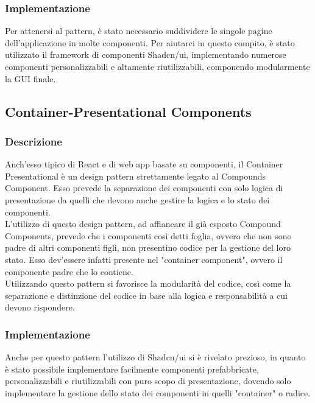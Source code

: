 \subsubsection{Implementazione}
Per attenersi al pattern, è stato necessario suddividere le singole pagine dell'applicazione in molte componenti. Per aiutarci in questo compito, è stato utilizzato il framework di componenti Shadcn/ui, implementando numerose componenti personalizzabili e altamente riutilizzabili, componendo modularmente la GUI finale.

\subsection{Container-Presentational Components}
\subsubsection{Descrizione}
Anch'esso tipico di React e di web app basate su componenti, il Container Presentational è un design pattern strettamente legato al Compounds Component. Esso prevede la separazione dei componenti con solo logica di presentazione da quelli che devono anche gestire la logica e lo stato dei componenti.\\L'utilizzo di questo design pattern, ad affiancare il già esposto Compound Components, prevede che i componenti così detti foglia, ovvero che non sono padre di altri componenti figli, non presentino codice per la gestione del loro stato. Esso dev'essere infatti presente nel "container component", ovvero il componente padre che lo contiene.\\Utilizzando questo pattern si favorisce la modularità del codice, così come la separazione e distinzione del codice in base alla logica e responsabilità a cui devono rispondere.
\subsubsection{Implementazione}
Anche per questo pattern l'utilizzo di Shadcn/ui si è rivelato prezioso, in quanto è stato possibile implementare facilmente componenti prefabbricate, personalizzabili e riutilizzabili con puro scopo di presentazione, dovendo solo implementare la gestione dello stato dei componenti in quelli "container" o radice.
